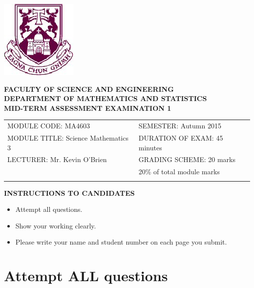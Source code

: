 \documentclass[a4paper,12pt]{article}
\begin{document}
\begin{center}
	\includegraphics[scale=0.60]{images/shieldtransparent2}
\end{center}

\begin{center}
	\vspace{1cm}
	\large \bf {FACULTY OF SCIENCE AND ENGINEERING} \\[0.5cm]
	\normalsize DEPARTMENT OF MATHEMATICS AND STATISTICS \\[1.25cm]
	\large \bf {MID-TERM ASSESSMENT EXAMINATION 1} \\[1.5cm]
\end{center}

\begin{tabular}{ll}
	MODULE CODE: MA4603 & SEMESTER: Autumn 2015\\[1cm]
	MODULE TITLE: Science Mathematics 3  & DURATION OF EXAM: 45 minutes \\[1cm]
	LECTURER: Mr. Kevin O'Brien & GRADING SCHEME: 20 marks \\
	& \phantom{GRadiC} \footnotesize {20\% of total module marks} \\[0.2cm]
	\\[1cm]
\end{tabular}
\begin{center}
	{\bf INSTRUCTIONS TO CANDIDATES}
\end{center}
\begin{itemize}
	\item Attempt all questions.
	\item Show your working clearly.
	\item Please write your name and student number on each page you submit.

\end{itemize}
\newpage
\section*{Attempt ALL questions}

\bigskip
\end{document}
